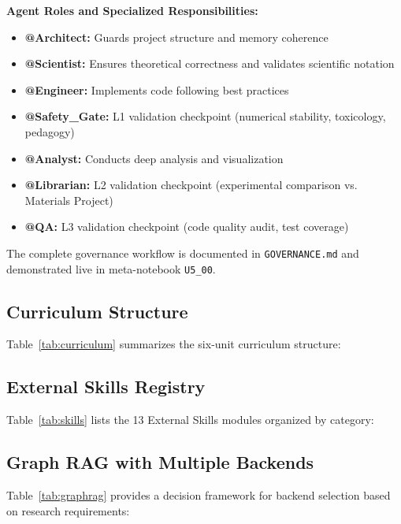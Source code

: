 \documentclass[11pt]{article}
\newcommand{\code}[1]{\texttt{#1}}
\begin{document}
\textbf{Agent Roles and Specialized Responsibilities:}

\begin{itemize}
    \item \textbf{@Architect:} Guards project structure and memory coherence
    \item \textbf{@Scientist:} Ensures theoretical correctness and validates scientific notation
    \item \textbf{@Engineer:} Implements code following best practices
    \item \textbf{@Safety\_Gate:} L1 validation checkpoint (numerical stability, toxicology, pedagogy)
    \item \textbf{@Analyst:} Conducts deep analysis and visualization
    \item \textbf{@Librarian:} L2 validation checkpoint (experimental comparison vs. Materials Project)
    \item \textbf{@QA:} L3 validation checkpoint (code quality audit, test coverage)
\end{itemize}

The complete governance workflow is documented in \code{GOVERNANCE.md} and demonstrated live in meta-notebook \code{U5\_00}.

\subsection{Curriculum Structure}

Table~\ref{tab:curriculum} summarizes the six-unit curriculum structure:



\subsection{External Skills Registry}

Table~\ref{tab:skills} lists the 13 External Skills modules organized by category:



\subsection{Graph RAG with Multiple Backends}

Table~\ref{tab:graphrag} provides a decision framework for backend selection based on research requirements:
\end{document}
